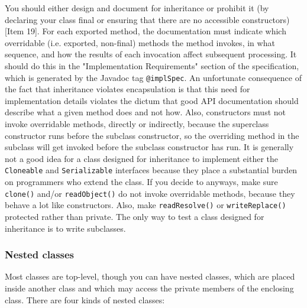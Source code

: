 \documentclass[table, xcdraw]{article}%
\begin{document}
You should either design and document for inheritance or prohibit it (by declaring your class final or ensuring that there are no accessible constructors) [Item 19]. For each exported method, the documentation must indicate which overridable (i.e. exported, non-final) methods the method invokes, in what sequence, and how the results of each invocation affect subsequent processing. It should do this in the "Implementation Requirements" section of the specification, which is generated by the Javadoc tag \texttt{@implSpec}. An unfortunate consequence of the fact that inheritance violates encapsulation is that this need for implementation details violates the dictum that good API documentation should describe what a given method does and not how. Also, constructors must not invoke overridable methods, directly or indirectly, because the superclass constructor runs before the subclass constructor, so the overriding method in the subclass will get invoked before the subclass constructor has run. It is generally not a good idea for a class designed for inheritance to implement either the \texttt{Cloneable} and \texttt{Serializable} interfaces because they place a substantial burden on programmers who extend the class. If you decide to anyways, make sure \texttt{clone()} and/or \texttt{readObject()} do not invoke overridable methods, because they behave a lot like constructors. Also, make \texttt{readResolve()} or \texttt{writeReplace()} protected rather than private. The only way to test a class designed for inheritance is to write subclasses.

\subsubsection{Nested classes}

Most classes are top-level, though you can have nested classes, which are placed inside another class and which may access the private members of the enclosing class. There are four kinds of nested classes:
\end{document}
